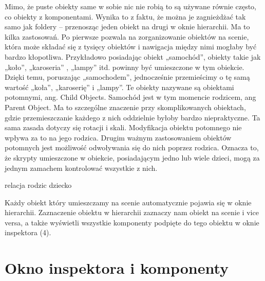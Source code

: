 \documentclass[brudnopis]{xmgr}
\begin{document}
Mimo, że puste obiekty same w sobie nic nie robią to są używane równie często, co obiekty z komponentami. Wynika to z faktu, że można je zagnieżdżać tak samo jak foldery – przenosząc jeden obiekt na drugi w oknie hierarchii. Ma to kilka zastosowań. Po pierwsze pozwala na zorganizowanie obiektów na scenie, która może składać się z tysięcy obiektów i nawigacja między nimi mogłaby być bardzo kłopotliwa. Przykładowo posiadając obiekt „samochód”, obiekty takie jak „koło”, „karoseria” , „lampy” itd. powinny być umieszczone w tym obiekcie. Dzięki temu, poruszając „samochodem”, jednocześnie przemieścimy o tę samą wartość „koła”, „karoserię” i „lampy”. Te obiekty nazywane są obiektami potomnymi, ang. Child Objects. Samochód jest w tym momencie rodzicem, ang Parent Object. Ma to szczególne znaczenie przy skomplikowanych obiektach, gdzie przemieszczanie każdego z nich oddzielnie byłoby bardzo niepraktyczne. Ta sama zasada dotyczy się rotacji i skali. Modyfikacja obiektu potomnego nie wpływa za to na jego rodzica. Drugim ważnym zastosowaniem obiektów potomnych jest możliwość odwoływania się do nich poprzez rodzica. Oznacza to, że skrypty umieszczone w obiekcie, posiadającym jedno lub wiele dzieci, mogą za jednym zamachem kontrolować wszystkie z nich.

relacja rodzic dziecko

Każdy obiekt który umieszczamy na scenie automatycznie pojawia się w oknie hierarchii. Zaznaczenie obiektu w hierarchii zaznaczy nam obiekt na scenie i vice versa, a także wyświetli wszystkie komponenty podpięte do tego obiektu w oknie inspektora (4).

\section{Okno inspektora i komponenty}
\end{document}
